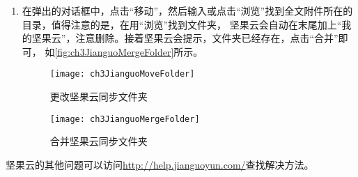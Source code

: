 \documentclass[cn,11pt,chinese]{elegantbook}
\begin{document}
\begin{enumerate}
			\item 在弹出的对话框中，点击“移动”，然后输入或点击“浏览”找到全文附件所在的目录，值得注意的是，在用“浏览”找到文件夹，
			坚果云会自动在末尾加上“我的坚果云”，注意删除。接着坚果云会提示，文件夹已经存在，点击“合并”即可，
			如\autoref{fig:ch3JianguoMergeFolder}所示。
			\begin{figure}[htbp]
				\centering
				\texttt{[image: ch3JianguoMoveFolder]}
				\caption{更改坚果云同步文件夹}
				\label{fig:ch3JianguoMoveFolder}
			\end{figure}
			
			\begin{figure}[htbp]
				\centering
				\texttt{[image: ch3JianguoMergeFolder]}
				\caption{合并坚果云同步文件夹}
				\label{fig:ch3JianguoMergeFolder}
			\end{figure}
		\end{enumerate}
		
		坚果云的其他问题可以访问\url{http://help.jianguoyun.com/}查找解决方法。
		
\end{document}
